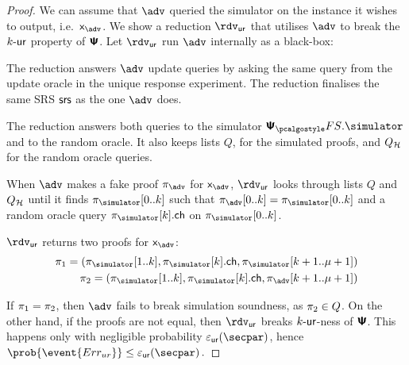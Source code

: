 \begin{proof}
  We can assume that $\adv$ queried the simulator on the instance it wishes to
  output, i.e.~$\inp_{\adv}$. We show a reduction $\rdvur$  that utilises $\adv$
  to break the ${k\text{-}\mathsf{ur}}$ property of $\bm{\mathsf{\Psi}}$. Let $\rdvur$ run $\advse$ internally
  as a black-box:
  \begin{compactitem}
  	\item The reduction answers $\adv$ update queries by asking the same query from the update oracle in the unique response experiment. The reduction finalises the same SRS $\mathsf{srs}$ as the one $\adv$ does.
  	\item The reduction answers both queries to the simulator $\psfs.\simulator$
  	and to the random oracle.  It also keeps lists $Q$, for the simulated
  	proofs, and $Q_{\mathcal{H}}$ for the random oracle queries.
  	\item When $\adv$ makes a fake proof $\zkproof_{\adv}$ for $\inp_{\adv}$,
  	$\rdvur$ looks through lists $Q$ and $Q_{\mathcal{H}}$ until it finds
  	$\zkproof_{\simulator}[0..k]$ such that
  	$\zkproof_{\adv}[0..k] = \zkproof_{\simulator}[0..k]$ and a random oracle
  	query $\zkproof_{\simulator}[k].\ch$ on $\zkproof_{\simulator}[0..k]$.
  	\item $\rdvur$ returns two proofs for $\inp_{\adv}$:
  	\begin{align*}
  	\zkproof_1 = (\zkproof_{\simulator}[1..k],
  	\zkproof_{\simulator}[k].\ch, \zkproof_{\simulator}[k + 1..\mu + 1])\\
  	\zkproof_2 = (\zkproof_{\simulator}[1..k],
  	\zkproof_{\simulator}[k].\ch, \zkproof_{\adv}[k + 1..\mu + 1])
  	\end{align*}
  \end{compactitem}  
  If $\pi_1 = \pi_2$, then $\adv$ fails to break simulation soundness,
  as $\pi_2 \in Q$. On the other hand, if the proofs are not equal, then
  $\rdvur$ breaks ${k\text{-}\mathsf{ur}}$-ness of $\bm{\mathsf{\Psi}}$. This happens only with negligible
  probability $\epsur(\secpar)$, hence
  \( \prob{\event{\errur}} \leq \epsur(\secpar)\,. \)

\end{proof}
